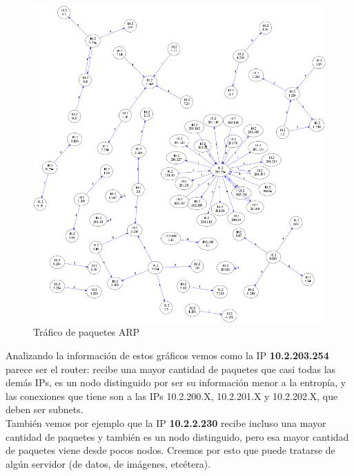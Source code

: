 \begin{figure}[H]
       \centering
       \includegraphics[width=1\textwidth]{../resultados/labo-corrida3/network.png}
       \caption{Tráfico de paquetes ARP}
       \label{red-Starbucks-dst-information}
\end{figure}

Analizando la información de estos gráficos vemos como la IP \textbf{10.2.203.254} parece ser el router: recibe una mayor cantidad de paquetes que casi todas las demás IPs, es un nodo distinguido por ser su información menor a la entropía, y las conexiones que tiene son a las IPs 10.2.200.X, 10.2.201.X y 10.2.202.X, que deben ser subnets.\\

También vemos por ejemplo que la IP \textbf{10.2.2.230} recibe incluso una mayor cantidad de paquetes y  también es un nodo distinguido, pero esa mayor cantidad de paquetes viene desde pocos nodos. Creemos por esto que puede tratarse de algún servidor (de datos, de imágenes, etcétera).